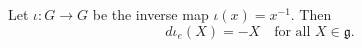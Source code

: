 Let $\iota: G \to G$ be the inverse map $\iota(x) = x^{-1}$. Then
$$d\iota_e(X) = -X \quad \text{for all } X \in \mathfrak{g}.$$
